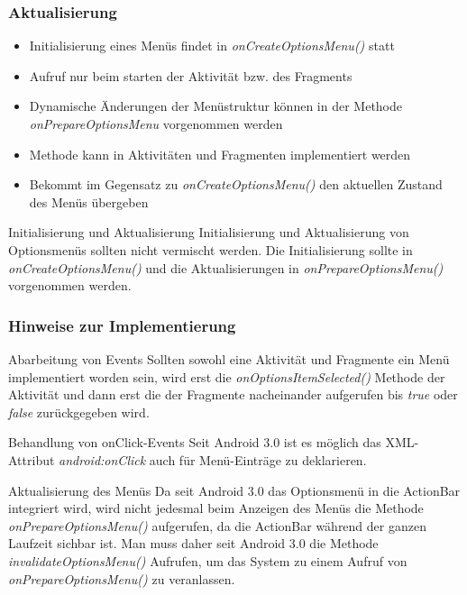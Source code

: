 \begin{frame}
   \frametitle{Aktualisierung}
   \begin{itemize}
      \item Initialisierung eines Menüs findet in \emph{onCreateOptionsMenu()} statt
      \item Aufruf nur beim starten der Aktivität bzw. des Fragments
      \item Dynamische Änderungen der Menüstruktur können in der Methode 
         \emph{onPrepareOptionsMenu} vorgenommen werden
      \item Methode kann in Aktivitäten und Fragmenten implementiert werden
      \item Bekommt im Gegensatz zu \emph{onCreateOptionsMenu()} den 
         aktuellen Zustand des Menüs übergeben
   \end{itemize}

   \begin{alertblock}{Initialisierung und Aktualisierung}
      Initialisierung und Aktualisierung von Optionsmenüs sollten nicht vermischt 
      werden. Die Initialisierung sollte in \emph{onCreateOptionsMenu()} und die 
      Aktualisierungen in \emph{onPrepareOptionsMenu()} vorgenommen werden.
   \end{alertblock}
\end{frame}

\begin{frame}
   \frametitle{Hinweise zur Implementierung}

   \begin{alertblock}{Abarbeitung von Events}
      Sollten sowohl eine Aktivität und Fragmente ein Menü implementiert worden sein, 
      wird erst die \emph{onOptionsItemSelected()} Methode der Aktivität und dann erst 
      die der Fragmente nacheinander aufgerufen bis \emph{true} oder \emph{false} 
      zurückgegeben wird.
   \end{alertblock}
   
   \begin{alertblock}{Behandlung von onClick-Events}
      Seit Android 3.0 ist es möglich das XML-Attribut \emph{android:onClick} 
      auch für Menü-Einträge zu deklarieren.
   \end{alertblock}
   
   \begin{alertblock}{Aktualisierung des Menüs}
      Da seit Android 3.0 das Optionsmenü in die ActionBar integriert wird, 
      wird nicht jedesmal beim Anzeigen des Menüs die Methode \emph{onPrepareOptionsMenu()} 
      aufgerufen, da die ActionBar während der ganzen Laufzeit sichbar ist. 
      Man muss daher seit Android 3.0 die Methode \emph{invalidateOptionsMenu()} 
      Aufrufen, um das System zu einem Aufruf von \emph{onPrepareOptionsMenu()} zu veranlassen.
   \end{alertblock}
\end{frame}

